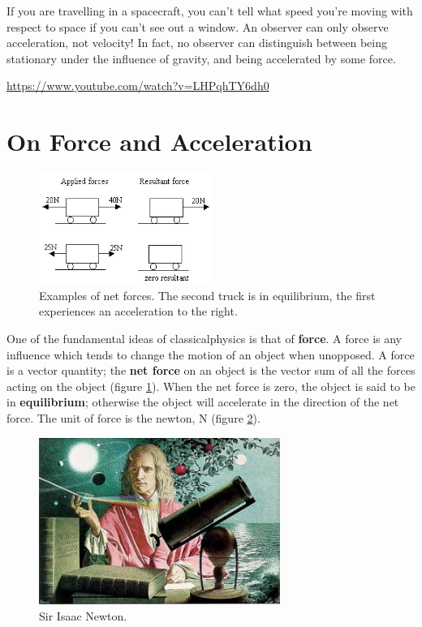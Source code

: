 \documentclass[a4paper]{amsbook}
\newcommand\capcite[1]{}
\begin{document}
If you are travelling in a spacecraft, you can't tell what speed you're moving with respect to space if you can't see
out a window. An observer can only observe acceleration, not velocity! In fact, no observer can distinguish between
being stationary under the influence of gravity, and being accelerated by some force.

\begin{center}
\begin{tcolorbox}[width=0.8\textwidth,colback={red},title={\textbf{Go and watch...}},colbacktitle=yellow,coltitle=blue]
  \textcolor{white}{\url{https://www.youtube.com/watch?v=LHPqhTY6dh0}}
\end{tcolorbox}
\end{center}

\section{On Force and Acceleration}
\begin{figure}
  \centering
  \includegraphics[width=0.5\textwidth]{resultantforce}
  \caption{Examples of net forces. The second truck is in equilibrium, the first experiences an acceleration to the right. \capcite{https://cdn.miniphysics.com/wp-content/uploads/2014/11/forces-in-opposite-direction.jpg}\label{fig:resultant}}
\end{figure}
One of the fundamental ideas of classicalphysics is that of \textbf{force}. A force is any influence which tends to change the motion of an object
when unopposed. A force is a vector quantity; the \textbf{net force} on an object is the vector sum of all the forces acting on the
object (figure \ref{fig:resultant}).
When the net force is zero, the object is said to be in \textbf{equilibrium}; otherwise the object will accelerate in the direction of
the net force. The unit of force is the newton, N (figure \ref{fig:newton}).
\begin{figure}
  \centering
  \includegraphics[width=0.7\textwidth]{newton}
  \caption{Sir Isaac Newton. \capcite{http://teachertech.rice.edu/Participants/louviere/Newton/newton5.jpg}\label{fig:newton}}
\end{figure}
\end{document}

